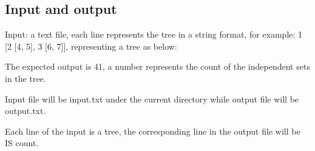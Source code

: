\documentclass{article}
\begin{document}
\subsection*{Input and output}
Input: a text file, each line represents the tree in a string format, for example: 1 [2 [4, 5], 3 [6, 7]], representing a tree as below:



The expected output is 41, a number represents the count of the independent sets in the tree. 

Input file will be input.txt under the current directory while output file will be output.txt.

Each line of the input is a tree, the corresponding line in the output file will be IS count.
\end{document}
